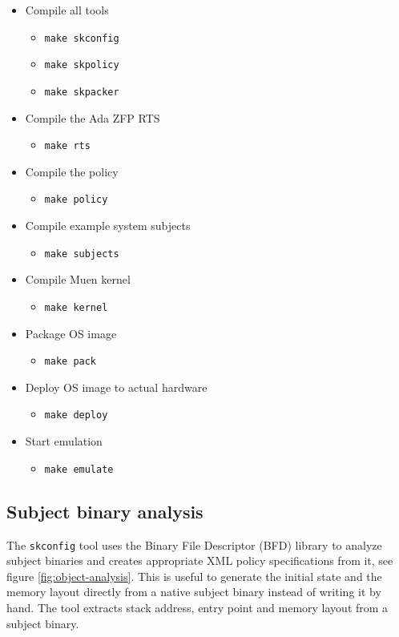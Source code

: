 \begin{itemize}
	\item Compile all tools
	\begin{itemize}
		\item \texttt{make skconfig}
		\item \texttt{make skpolicy}
		\item \texttt{make skpacker}
	\end{itemize}
	\item Compile the Ada ZFP RTS
	\begin{itemize}
		\item \texttt{make rts}
	\end{itemize}
	\item Compile the policy
	\begin{itemize}
		\item \texttt{make policy}
	\end{itemize}
	\item Compile example system subjects
	\begin{itemize}
		\item \texttt{make subjects}
	\end{itemize}
	\item Compile Muen kernel
	\begin{itemize}
		\item \texttt{make kernel}
	\end{itemize}
	\item Package OS image
	\begin{itemize}
		\item \texttt{make pack}
	\end{itemize}
	\item Deploy OS image to actual hardware
	\begin{itemize}
		\item \texttt{make deploy}
	\end{itemize}
	\item Start emulation
	\begin{itemize}
		\item \texttt{make emulate}
	\end{itemize}
\end{itemize}

\subsection{Subject binary analysis}\label{subsec:subject-binary-analysis}
The \texttt{skconfig} tool uses the Binary File Descriptor (BFD)
library to analyze subject binaries and creates appropriate XML
policy specifications from it, see figure \ref{fig:object-analysis}. This is
useful to generate the initial state and the memory layout directly from a
native subject binary instead of writing it by hand. The tool extracts stack
address, entry point and memory layout from a subject binary.

